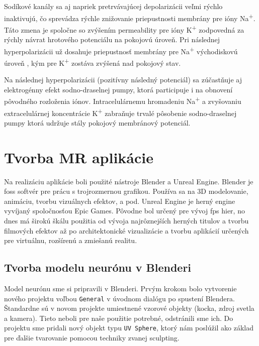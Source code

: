 Sodíkové kanály sa aj napriek pretrvávajúcej depolarizácii veľmi rýchlo inaktivujú, čo sprevádza rýchle znižovanie priepustnosti membrány pre ióny Na\textsuperscript{+}. Táto zmena je spoločne 
so zvýšením permeability pre ióny K\textsuperscript{+} zodpovedná za rýchly návrat hrotového potenciálu na pokojovú úroveň. Pri následnej hyperpolarizácii už dosahuje priepustnosť membrány pre 
Na\textsuperscript{+} východiskovú úroveň , kým pre K\textsuperscript{+} zostáva zvýšená nad pokojový stav.

Na následnej hyperpolarizácii (pozitívny následný potenciál) sa zúčastňuje aj elektrogénny efekt sodno-draselnej pumpy, ktorá participuje i na obnovení pôvodného rozloženia iónov.
Intracelulárnemu hromadeniu Na\textsuperscript{+} a zvyšovaniu extracelulárnej koncentrácie K\textsuperscript{+} zabraňuje trvalé pôsobenie sodno-draselnej pumpy ktorá udržuje stály pokojový 
membránový potenciál. \cite{javorkaLekarskaFyziologiaUcebnica2001}

\section{Tvorba MR aplikácie}

Na realizáciu aplikácie boli použité nástroje Blender a Unreal Engine. Blender je \acrshort{foss} softvér pre prácu s trojrozmernou grafikou. Používa sa na 3D modelovanie,
animáciu, tvorbu vizuálnych efektov, a pod. Unreal Engine je herný engine vyvíjaný spoločnosťou Epic Games. Pôvodne bol určený pre vývoj \acrshort{fps} hier, no dnes má širokú škálu použitia
od vývoja najrôznejších herných titulov a tvorbu filmových efektov až po architektonické vizualizácie a tvorbu aplikácií určených pre virtuálnu, rozšírenú a zmiešanú realitu.

\subsection{Tvorba modelu neurónu v Blenderi}
Model neurónu sme si pripravili v Blenderi. Prvým krokom bolo vytvorenie nového projektu voľbou \texttt{General} v úvodnom dialógu po spustení Blendera. Štandardne sú v novom projekte 
umiestnené vzorové objekty (kocka, zdroj svetla a kamera). Tieto neboli pre naše použitie potrebné, odstránili sme ich. Do projektu sme pridali nový objekt typu \texttt{UV Sphere}, 
ktorý nám poslúžil ako základ pre ďalšie tvarovanie pomocou techniky zvanej sculpting. 

